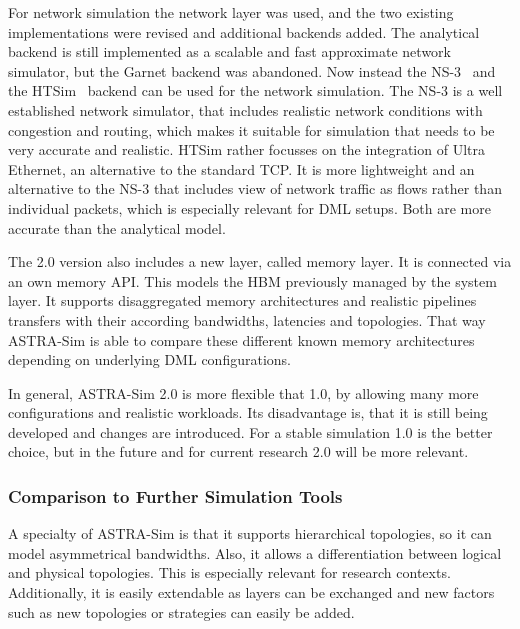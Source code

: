 For network simulation the network layer was used, and the two existing implementations were revised and additional backends added. 
The analytical backend is still implemented as a scalable and fast approximate network simulator, but the Garnet backend was abandoned.  
Now instead the \ac{NS-3}~\cite{riley_ns-3_2010} and the \ac{HTSim}~\cite{besta_towards_2021} backend can be used for the network simulation. 
The \ac{NS-3} is a well established network simulator, that includes realistic network conditions with congestion and routing, which makes it suitable for simulation that needs to be very accurate and realistic. \ac{HTSim} rather focusses on the integration of Ultra Ethernet, an alternative to the standard \ac{TCP}. It is more lightweight and an alternative to the \ac{NS-3} that includes view of network traffic as flows rather than individual packets, which is especially relevant for \ac{DML} setups.
Both are more accurate than the analytical model. %

The 2.0 version also includes a new layer, called memory layer. It is connected via an own memory \ac{API}. This models the \ac{HBM} previously managed by the system layer. It supports disaggregated memory architectures and realistic pipelines transfers with their according bandwidths, latencies and topologies. That way \ac{ASTRA-Sim} is able to compare these different known memory architectures depending on underlying \ac{DML} configurations.

In general, \ac{ASTRA-Sim} 2.0 is more flexible that 1.0, by allowing many more configurations and realistic workloads. Its disadvantage is, that it is still being developed and changes are introduced. For a stable simulation 1.0 is the better choice, but in the future and for current research 2.0 will be more relevant.


\subsubsection*{Comparison to Further Simulation Tools}

A specialty of \ac{ASTRA-Sim} is that it supports hierarchical topologies, so it can model asymmetrical bandwidths. Also, it allows a differentiation between logical and physical topologies. This is especially relevant for research contexts.
Additionally, it is easily extendable as layers can be exchanged and new factors such as new topologies or strategies can easily be added.

